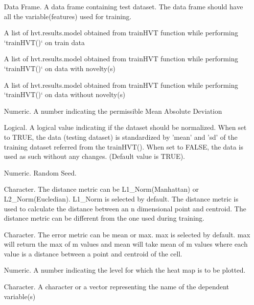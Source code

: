 \documentclass[letterpaper]{book}
\begin{document}
%
\begin{Arguments}
\begin{ldescription}
\item[\code{data}] Data Frame. A data frame containing test dataset. 
The data frame should have all the variable(features) used for training.

\item[\code{hvt\_mapA}] A list of hvt.results.model obtained from trainHVT function while performing
`trainHVT()` on train data

\item[\code{hvt\_mapB}] A list of hvt.results.model obtained from trainHVT function while performing 
`trainHVT()` on data with novelty(s)

\item[\code{hvt\_mapC}] A list of hvt.results.model obtained from trainHVT function while performing
`trainHVT()` on data without novelty(s)

\item[\code{mad.threshold}] Numeric. A number indicating the permissible Mean Absolute Deviation

\item[\code{normalize}] Logical. A logical value indicating if the dataset should be normalized. 
When set to TRUE, the data (testing dataset) is standardized by 'mean' and 'sd' of the training dataset 
referred from the trainHVT(). When set to FALSE, the data is used as such without any changes.
(Default value is TRUE).

\item[\code{seed}] Numeric. Random Seed.

\item[\code{distance\_metric}] Character. The distance metric can be L1\_Norm(Manhattan) or L2\_Norm(Eucledian). L1\_Norm is selected by default.
The distance metric is used to calculate the distance between an n dimensional point and centroid.
The distance metric can be different from the one used during training.

\item[\code{error\_metric}] Character. The error metric can be mean or max. max is selected by default. 
max will return the max of m values and mean will take mean of m values where
each value is a distance between a point and centroid of the cell.

\item[\code{child.level}] Numeric. A number indicating the level for which the heat map is to be plotted.

\item[\code{yVar}] Character. A character or a vector representing the name of the dependent variable(s)
\end{ldescription}
\end{Arguments}
\end{document}
